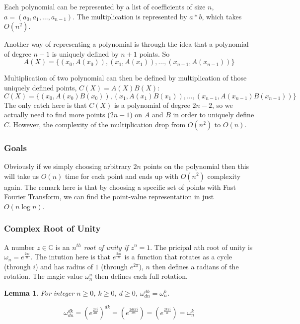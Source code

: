 \documentclass[10pt]{article}
\newtheorem{lemma}{Lemma}
\begin{document}
Each polynomial can be represented by a list of coefficients of size $n$, $a =
(a_0, a_1, \ldots, a_{n-1})$. The multiplication is represented by $a
* b$, which takes $O(n^2)$.

Another way of representing a polynomial is through the idea that a polynomial
of degree $n-1$ is uniquely defined by $n+1$ points. So
\[
    A(X) = \{(x_0, A(x_0)), (x_1, A(x_1)), \ldots, (x_{n-1}, A(x_{n-1}))\}
\]

Multiplication of two polynomial can then be defined by multiplication of those
uniquely defined points, $C(X) = A(X)B(X)$:
\[
    C(X) = \{(x_0, A(x_0)B(x_0)), (x_1, A(x_1)B(x_1)), \ldots, (x_{n-1}, A(x_{n-1})B(x_{n-1}))\}
\]
The only catch here is that $C(X)$ is a polynomial of degree $2n-2$, so we
actually need to find more points ($2n-1$) on $A$ and $B$ in order to uniquely define $C$.
However, the complexity of the multiplication drop from $O(n^2)$ to $O(n)$.

\subsubsection{Goals}
Obviously if we simply choosing arbitrary $2n$ points on the polynomial then
this will take us $O(n)$ time for each point and ends up with $O(n^2)$
complexity again. The remark here is that by choosing a specific set of points
with Fast Fourier Transform, we can find the point-value representation in
just $O(n\log n)$.

\subsubsection{Complex Root of Unity}
A number $z \in \mathbb{C}$ is an \emph{$n^{th}$ root of unity if $z^n = 1$}.
The pricipal $n$th root of unity is $\omega_n = e^{\frac{2\pi i}{n}}$.
The intution here is that $e^{\frac{2\pi i}{n}}$ is a function that rotates
as a cycle (through $i$) and has radius of $1$ (through $e^{2\pi}$), $n$ then
defines a radians of the rotation. The magic value $\omega_n^n$ then defines
each full rotation.

\begin{lemma}\label{cancel-lemma}
    For integer $n\geq 0$, $k \geq 0$, $d \geq 0$, $\omega^{dk}_{dn} = \omega^{k}_{n}$.
\end{lemma}
$$\omega^{dk}_{dn} = (e^{\frac{2\pi i}{dn}})^{dk} = (e^{\frac{2dk\pi i}{dn}}) = 
(e^{\frac{2k\pi i}{n}}) = \omega_n^{k}
$$
\end{document}
